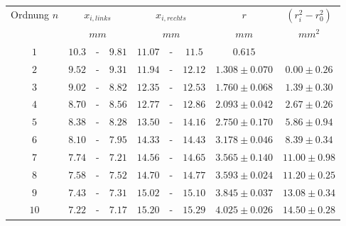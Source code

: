 \begin{tabular}{c|ccc|ccc|c|c} 
Ordnung \(n\) & \multicolumn{3}{c|}{\(x_{i,links}\)} & \multicolumn{3}{c|}{\(x_{i,rechts}\)} & \(r\) & \(\left( r_i^2 - r_0^2 \right)\)\\
& \multicolumn{3}{c|}{\(mm\)} & \multicolumn{3}{c|}{\(mm\)}  & \(mm\) & \(mm^2\) \\ \hline
\(1\) & \(10.3\) & - & \(9.81\) & \(11.07\) & - & \(11.5\) & \(0.615\) & \\ 						
\(2\) & \(9.52\) & - & \(9.31\) & \(11.94\) & - & \(12.12\) & \(1.308\pm 0.070\) & \(0.00\pm 0.26\)\\
\(3\) & \(9.02\) & - & \(8.82\) & \(12.35\) & - & \(12.53\) & \(1.760\pm 0.068\) & \(1.39\pm 0.30\)\\
\(4\) & \(8.70\) & - & \(8.56\) & \(12.77\) & - & \(12.86\) & \(2.093\pm 0.042\) & \(2.67\pm 0.26\)\\
\(5\) & \(8.38\) & - & \(8.28\) & \(13.50\) & - & \(14.16\) & \(2.750\pm 0.170\) & \(5.86\pm 0.94\)\\
\(6\) & \(8.10\) & - & \(7.95\) & \(14.33\) & - & \(14.43\) & \(3.178\pm 0.046\) & \(8.39\pm 0.34\)\\
\(7\) & \(7.74\) & - & \(7.21\) & \(14.56\) & - & \(14.65\) & \(3.565\pm 0.140\) & \(11.00\pm 0.98\)\\
\(8\) & \(7.58\) & - & \(7.52\) & \(14.70\) & - & \(14.77\) & \(3.593\pm 0.024\) & \(11.20\pm 0.25\)\\
\(9\) & \(7.43\) & - & \(7.31\) & \(15.02\) & - & \(15.10\) & \(3.845\pm 0.037\) & \(13.08\pm 0.34\)\\
\(10\) & \(7.22\) & - & \(7.17\) & \(15.20\) & - & \(15.29\) & \(4.025\pm 0.026\) & \(14.50\pm 0.28\)\\
\end{tabular}